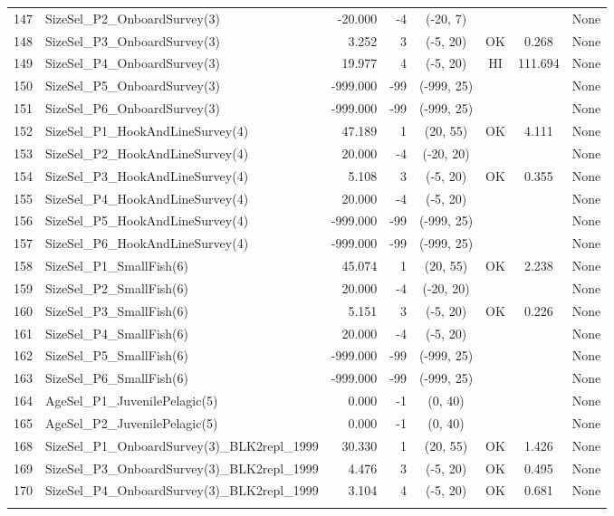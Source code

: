 \documentclass[12pt,]{article}
\begin{document}
\begin{landscape}
\begin{longtable}{rlrrcccl}
  147 & SizeSel\_P2\_OnboardSurvey(3) & -20.000 & -4 & (-20, 7) &  &  & None \\ 
  148 & SizeSel\_P3\_OnboardSurvey(3) & 3.252 & 3 & (-5, 20) & OK & 0.268 & None \\ 
  149 & SizeSel\_P4\_OnboardSurvey(3) & 19.977 & 4 & (-5, 20) & HI & 111.694 & None \\ 
  150 & SizeSel\_P5\_OnboardSurvey(3) & -999.000 & -99 & (-999, 25) &  &  & None \\ 
  151 & SizeSel\_P6\_OnboardSurvey(3) & -999.000 & -99 & (-999, 25) &  &  & None \\ 
  152 & SizeSel\_P1\_HookAndLineSurvey(4) & 47.189 & 1 & (20, 55) & OK & 4.111 & None \\ 
  153 & SizeSel\_P2\_HookAndLineSurvey(4) & 20.000 & -4 & (-20, 20) &  &  & None \\ 
  154 & SizeSel\_P3\_HookAndLineSurvey(4) & 5.108 & 3 & (-5, 20) & OK & 0.355 & None \\ 
  155 & SizeSel\_P4\_HookAndLineSurvey(4) & 20.000 & -4 & (-5, 20) &  &  & None \\ 
  156 & SizeSel\_P5\_HookAndLineSurvey(4) & -999.000 & -99 & (-999, 25) &  &  & None \\ 
  157 & SizeSel\_P6\_HookAndLineSurvey(4) & -999.000 & -99 & (-999, 25) &  &  & None \\ 
  158 & SizeSel\_P1\_SmallFish(6) & 45.074 & 1 & (20, 55) & OK & 2.238 & None \\ 
  159 & SizeSel\_P2\_SmallFish(6) & 20.000 & -4 & (-20, 20) &  &  & None \\ 
  160 & SizeSel\_P3\_SmallFish(6) & 5.151 & 3 & (-5, 20) & OK & 0.226 & None \\ 
  161 & SizeSel\_P4\_SmallFish(6) & 20.000 & -4 & (-5, 20) &  &  & None \\ 
  162 & SizeSel\_P5\_SmallFish(6) & -999.000 & -99 & (-999, 25) &  &  & None \\ 
  163 & SizeSel\_P6\_SmallFish(6) & -999.000 & -99 & (-999, 25) &  &  & None \\ 
  164 & AgeSel\_P1\_JuvenilePelagic(5) & 0.000 & -1 & (0, 40) &  &  & None \\ 
  165 & AgeSel\_P2\_JuvenilePelagic(5) & 0.000 & -1 & (0, 40) &  &  & None \\ 
  168 & SizeSel\_P1\_OnboardSurvey(3)\_BLK2repl\_1999 & 30.330 & 1 & (20, 55) & OK & 1.426 & None \\ 
  169 & SizeSel\_P3\_OnboardSurvey(3)\_BLK2repl\_1999 & 4.476 & 3 & (-5, 20) & OK & 0.495 & None \\ 
  170 & SizeSel\_P4\_OnboardSurvey(3)\_BLK2repl\_1999 & 3.104 & 4 & (-5, 20) & OK & 0.681 & None \\ 
   \hline
\hline
\label{tab:Model2_params}
\end{longtable}
\end{landscape}
\end{document}
